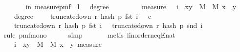 \begin{isabellebody}
\ \ \isamarkupfalse%
\isanewline
\isanewline
\ \ \isamarkupfalse%
\ {\isachardoublequoteopen}{\isasymP}{\isacharparenleft}{\kern0pt}{\isasymomega}\ in\ measure{\isacharunderscore}{\kern0pt}pmf\ {\isasymOmega}{\isachardot}{\kern0pt}\ {\isacharquery}{\kern0pt}l\ {\isasymomega}\ {\isasymand}\ degree\ {\isasymomega}\ {\isasymge}\ {}{\isacharparenright}{\kern0pt}\ {\isasymle}\ \isanewline
\ \ \ \ measure\ {\isasymOmega}\ {\isacharparenleft}{\kern0pt}{\isasymUnion}\ i\ {\isasymin}\ {\isacharbraceleft}{\kern0pt}{\isacharparenleft}{\kern0pt}x{\isacharcomma}{\kern0pt}y{\isacharparenright}{\kern0pt}\ {\isasymin}\ M\ {\isasymtimes}\ M{\isachardot}{\kern0pt}\ x\ {\isacharless}{\kern0pt}\ y{\isacharbraceright}{\kern0pt}{\isachardot}{\kern0pt}\ {\isacharbraceleft}{\kern0pt}{\isasymomega}{\isachardot}{\kern0pt}\ \isanewline
\ \ \ \ degree\ {\isasymomega}\ {\isasymge}\ {}\ {\isasymand}\ truncate{\isacharunderscore}{\kern0pt}down\ r\ {\isacharparenleft}{\kern0pt}hash\ p\ {\isacharparenleft}{\kern0pt}fst\ i{\isacharparenright}{\kern0pt}\ {\isasymomega}{\isacharparenright}{\kern0pt}\ {\isasymle}\ c\ {\isasymand}\isanewline
\ \ \ \ truncate{\isacharunderscore}{\kern0pt}down\ r\ {\isacharparenleft}{\kern0pt}hash\ p\ {\isacharparenleft}{\kern0pt}fst\ i{\isacharparenright}{\kern0pt}\ {\isasymomega}{\isacharparenright}{\kern0pt}\ {\isacharequal}{\kern0pt}\ truncate{\isacharunderscore}{\kern0pt}down\ r\ {\isacharparenleft}{\kern0pt}hash\ p\ {\isacharparenleft}{\kern0pt}snd\ i{\isacharparenright}{\kern0pt}\ {\isasymomega}{\isacharparenright}{\kern0pt}{\isacharbraceright}{\kern0pt}{\isacharparenright}{\kern0pt}{\isachardoublequoteclose}\isanewline
\ \ \ \ \isamarkupfalse%
\ {\isacharparenleft}{\kern0pt}rule\ pmf{\isacharunderscore}{\kern0pt}mono{\isacharparenright}{\kern0pt}\isanewline
\ \ \ \ \isamarkupfalse%
\ {\isacharparenleft}{\kern0pt}simp{\isacharparenright}{\kern0pt}\ \isanewline
\ \ \ \ \isamarkupfalse%
\ {\isacharparenleft}{\kern0pt}metis\ linorder{\isacharunderscore}{\kern0pt}neqE{\isacharunderscore}{\kern0pt}nat{\isacharparenright}{\kern0pt}\isanewline
\ \ \isamarkupfalse%
\ \isamarkupfalse%
\ {\isachardoublequoteopen}{\isachardot}{\kern0pt}{\isachardot}{\kern0pt}{\isachardot}{\kern0pt}\ {\isasymle}\ {\isacharparenleft}{\kern0pt}{\isasymSum}\ i\ {\isasymin}\ {\isacharbraceleft}{\kern0pt}{\isacharparenleft}{\kern0pt}x{\isacharcomma}{\kern0pt}y{\isacharparenright}{\kern0pt}\ {\isasymin}\ M\ {\isasymtimes}\ M{\isachardot}{\kern0pt}\ x\ {\isacharless}{\kern0pt}\ y{\isacharbraceright}{\kern0pt}{\isachardot}{\kern0pt}\ measure\ {\isasymOmega}\ \isanewline

\end{isabellebody}
